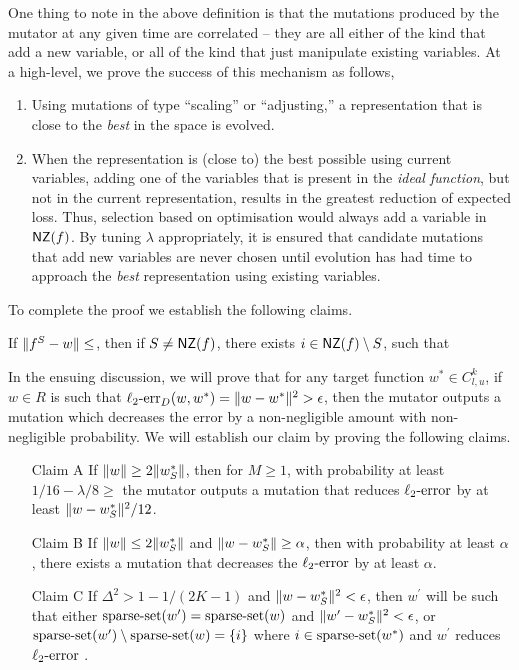 One thing to note in the above definition is that the mutations produced by the
mutator at any given time are correlated -- \ie they are all either of the kind that
add a new variable, or all of the kind that just manipulate existing variables.
At a high-level, we prove the success of this mechanism as follows,
\begin{enumerate}
\item Using mutations of type ``scaling'' or ``adjusting,'' a representation
that is close to the \emph{best} in the space is evolved.
\item When the representation is (close to) the best possible using current
variables, adding one of the variables that is present in the \emph{ideal
function}, but not in the current representation,
results in the greatest reduction of expected loss. Thus, selection
based on optimisation would always add a variable in $\mathsf{NZ}(f)$. By tuning
$\lambda$ appropriately, it is ensured that candidate mutations that add new
variables are never chosen until evolution has had time to approach the
\emph{best} representation using existing variables.
\end{enumerate}

To complete the proof we establish the following claims.
\begin{claim} \label{claim:date} If $\Vert f^S - w \Vert \leq $, then if $S \neq \mathsf{NZ}(f)$, there exists $i \in \mathsf{NZ}(f) \setminus S$, such
that 

\end{claim}

In the ensuing discussion, we will prove that for any target function
$w^* \in C^k_{l,u}$, if $w \in R$ is such that
$\mathrm{\ell_2\mbox{-}err}_D(w, w^*) = \Vert w - w^* \Vert^2 > \epsilon$,
then the mutator outputs a mutation which decreases the error by a
non-negligible amount with non-negligible probability.
We will establish our claim by proving the following claims.

\begin{enumerate}
\item[Claim A] If $\Vert w \Vert \ge 2 \Vert w^*_S \Vert$, then for $M \ge 1$,
with probability at least $1/16 - \lambda/8 \ge $  the mutator outputs
a mutation that reduces $\mathrm{\ell_2\mbox{-}error}$ by at least $\Vert w - w^*_S \Vert^2 / 12$.
\item[Claim B] If $\Vert w \Vert \le 2 \Vert w^*_S \Vert$ and
$\Vert w - w^*_S \Vert \ge \alpha$, then with probability at least $\alpha$,
there exists a mutation that decreases the $\mathrm{\ell_2\mbox{-}error}$ by at least $\alpha$.
\item[Claim C] If $\Delta^2 > 1 - 1/(2 K - 1)$ and
$\Vert w - w^*_S \Vert^2 < \epsilon$, then $w^\prime$ will be
such that either $\mathrm{sparse\mbox{-}set}(w^\prime) = \mathrm{sparse\mbox{-}set}(w)$ and
$\Vert w^\prime - w^*_S \Vert^2 < \epsilon$, or
$\mathrm{sparse\mbox{-}set}(w^\prime) \setminus \mathrm{sparse\mbox{-}set}(w) = \{i\}$ where $i \in \mathrm{sparse\mbox{-}set}(w^*)$
and $w^\prime$ reduces $\mathrm{\ell_2\mbox{-}error}$ .
\end{enumerate}

